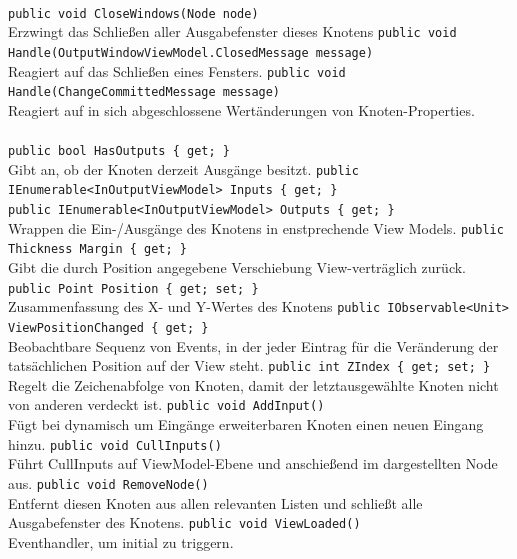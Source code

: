 \paragraph{}
\begin{itemize}
	\add \verb!public void CloseWindows(Node node)! \\
	Erzwingt das Schließen aller Ausgabefenster dieses Knotens
	\add \verb!public void Handle(OutputWindowViewModel.ClosedMessage message)! \\
	Reagiert auf das Schließen eines Fensters.
	\add \verb!public void Handle(ChangeCommittedMessage message)! \\
	Reagiert auf in sich abgeschlossene Wertänderungen von Knoten-Properties.
\end{itemize}

\paragraph{}
\begin{itemize}
	\add \verb!public bool HasOutputs { get; }! \\
	Gibt an, ob der Knoten derzeit Ausgänge besitzt.
	\add \verb!public IEnumerable<InOutputViewModel> Inputs { get; }! \\
	\verb!public IEnumerable<InOutputViewModel> Outputs { get; }! \\
	Wrappen die Ein-/Ausgänge des Knotens in enstprechende View Models.
	\add \verb!public Thickness Margin { get; }! \\
	Gibt die durch Position angegebene Verschiebung View-verträglich zurück.
	\add \verb!public Point Position { get; set; }! \\
	Zusammenfassung des X- und Y-Wertes des Knotens
	\add \verb!public IObservable<Unit> ViewPositionChanged { get; }! \\
	Beobachtbare Sequenz von Events, in der jeder Eintrag für die Veränderung der tatsächlichen Position auf der View steht.
	\add \verb!public int ZIndex { get; set; }! \\
	Regelt die Zeichenabfolge von Knoten, damit der letztausgewählte Knoten nicht von anderen verdeckt ist.
	\add \verb!public void AddInput()! \\
	Fügt bei dynamisch um Eingänge erweiterbaren Knoten einen neuen Eingang hinzu.
	\add \verb!public void CullInputs()! \\
	Führt CullInputs auf ViewModel-Ebene und anschießend im dargestellten Node aus.
	\add \verb!public void RemoveNode()! \\
	Entfernt diesen Knoten aus allen relevanten Listen und schließt alle Ausgabefenster des Knotens.
	\add \verb!public void ViewLoaded()! \\
	Eventhandler, um  initial zu triggern.
\end{itemize}


